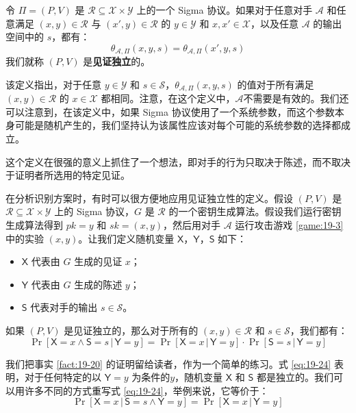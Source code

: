 \begin{definition}
令 $\Pi=(P,V)$ 是 $\mathcal{R}\subseteq\mathcal{X}×\mathcal{Y}$ 上的一个 Sigma 协议。如果对于任意对手 $\mathcal{A}$ 和任意满足 $(x,y)\in\mathcal{R}$ 与 $(x',y)\in\mathcal{R}$ 的 $y\in\mathcal{Y}$ 和 $x,x'\in\mathcal{X}$，以及任意 $\mathcal{A}$ 的输出空间中的 $s$，都有：
$$
\theta_{\mathcal{A},\Pi}(x,y,s)=
\theta_{\mathcal{A},\Pi}(x',y,s)
$$
我们就称 $(P,V)$ 是\textbf{见证独立}的。
\end{definition}

该定义指出，对于任意 $y\in\mathcal{Y}$ 和 $s\in\mathcal{S}$，$\theta_{\mathcal{A},\Pi}(x,y,s)$ 的值对于所有满足 $(x,y)\in\mathcal{R}$ 的 $x\in\mathcal{X}$ 都相同。注意，在这个定义中，$\mathcal{A}$不需要是有效的。我们还可以注意到，在该定义中，如果 Sigma 协议使用了一个系统参数，而这个参数本身可能是随机产生的，我们坚持认为该属性应该对每个可能的系统参数的选择都成立。

这个定义在很强的意义上抓住了一个想法，即对手的行为只取决于陈述，而不取决于证明者所选用的特定见证。

在分析识别方案时，有时可以很方便地应用见证独立性的定义。假设 $(P,V)$ 是 $\mathcal{R}\subseteq\mathcal{X}\times\mathcal{Y}$ 上的 Sigma 协议，$G$ 是 $\mathcal{R}$ 的一个密钥生成算法。假设我们运行密钥生成算法得到 $pk=y$ 和 $sk=(x,y)$，然后用对手 $\mathcal{A}$ 运行攻击游戏 \ref{game:19-3} 中的实验 $(x,y)$。让我们定义随机变量 $\mathsf{X}$，$\mathsf{Y}$，$\mathsf{S}$ 如下：
\begin{itemize}
	\item $\mathsf{X}$ 代表由 $G$ 生成的见证 $x$；
	\item $\mathsf{Y}$ 代表由 $G$ 生成的陈述 $y$；
	\item $\mathsf{S}$ 代表对手的输出 $s\in\mathcal{S}$。
\end{itemize}

\begin{fact}\label{fact:19-20}
如果 $(P,V)$ 是见证独立的，那么对于所有的 $(x,y)\in\mathcal{R}$ 和 $s\in\mathcal{S}$，我们都有：
\begin{equation}\label{eq:19-24}
\Pr[\mathsf{X}=x\land\mathsf{S}=s\,|\,\mathsf{Y}=y]=
\Pr[\mathsf{X}=x\,|\,\mathsf{Y}=y]\cdot
\Pr[\mathsf{S}=s\,|\,\mathsf{Y}=y]
\end{equation}
\end{fact}

我们把事实 \ref{fact:19-20} 的证明留给读者，作为一个简单的练习。式 \ref{eq:19-24} 表明，对于任何特定的以 $\mathsf{Y}=y$ 为条件的$y$，随机变量 $\mathsf{X}$ 和 $\mathsf{S}$ 都是独立的。我们可以用许多不同的方式重写式 \ref{eq:19-24}，举例来说，它等价于：
\begin{equation}\label{eq:19-25}
\Pr[\mathsf{X}=x\,|\,\mathsf{S}=s\land\mathsf{Y}=y]=
\Pr[\mathsf{X}=x\,|\,\mathsf{Y}=y]
\end{equation}

